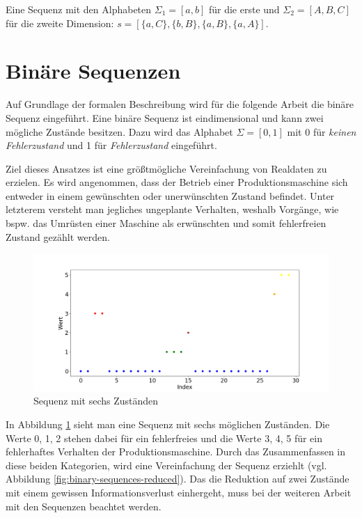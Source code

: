 \begin{theorem}
Eine Sequenz mit den Alphabeten $\Sigma_{1} = [a,b]$ für die erste und $\Sigma_{2} = [A,B,C]$ für die zweite Dimension: $s = [\{a,C\},\{b,B\},\{a,B\},\{a,A\}]$.
\end{theorem}

\section{Binäre Sequenzen}
\label{chp:binary-sequences}
Auf Grundlage der formalen Beschreibung wird für die folgende Arbeit die binäre Sequenz eingeführt. Eine binäre Sequenz ist eindimensional und kann zwei mögliche Zustände besitzen. Dazu wird das Alphabet $\Sigma = [0,1]$ mit 0 für \textit{keinen Fehlerzustand} und 1 für \textit{Fehlerzustand} eingeführt.

Ziel dieses Ansatzes ist eine größtmögliche Vereinfachung von Realdaten zu erzielen. Es wird angenommen, dass der Betrieb einer Produktionsmaschine sich entweder in einem gewünschten oder unerwünschten Zustand befindet. Unter letzterem versteht man jegliches ungeplante Verhalten, weshalb Vorgänge, wie bspw. das Umrüsten einer Maschine als erwünschten und somit fehlerfreien Zustand gezählt werden. 

\begin{figure}[H]
	\centering
	\includegraphics[scale=0.32]{images/sequences/binary-sequences-full}
	\caption{Sequenz mit sechs Zuständen}
	\label{fig:binary-sequences-full}
\end{figure}

In Abbildung \ref{fig:binary-sequences-full} sieht man eine Sequenz mit sechs möglichen Zuständen. Die Werte 0, 1, 2 stehen dabei für ein fehlerfreies und die Werte 3, 4, 5 für ein fehlerhaftes Verhalten der Produktionsmaschine. Durch das Zusammenfassen in diese beiden Kategorien, wird eine Vereinfachung der Sequenz erziehlt (vgl. Abbildung \ref{fig:binary-sequences-reduced}). Das die Reduktion auf zwei Zustände mit einem gewissen Informationsverlust einhergeht, muss bei der weiteren Arbeit mit den Sequenzen beachtet werden.

